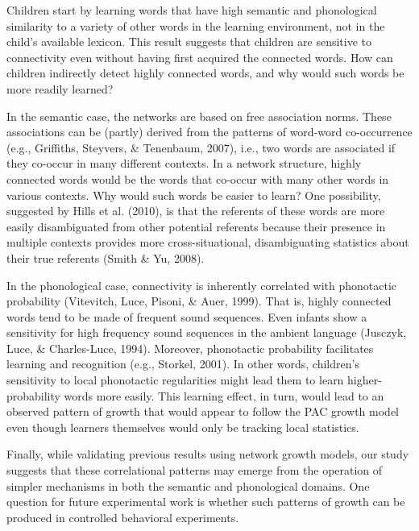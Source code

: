 \documentclass[10pt, letterpaper]{article}
\begin{document}
Children start by learning words that have high semantic and
phonological similarity to a variety of other words in the learning
environment, not in the child's available lexicon. This result suggests
that children are sensitive to connectivity even without having first
acquired the connected words. How can children indirectly detect highly
connected words, and why would such words be more readily learned?

In the semantic case, the networks are based on free association norms.
These associations can be (partly) derived from the patterns of
word-word co-occurrence (e.g., Griffiths, Steyvers, \& Tenenbaum, 2007),
i.e., two words are associated if they co-occur in many different
contexts. In a network structure, highly connected words would be the
words that co-occur with many other words in various contexts. Why would
such words be easier to learn? One possibility, suggested by Hills et
al. (2010), is that the referents of these words are more easily
disambiguated from other potential referents because their presence in
multiple contexts provides more cross-situational, disambiguating
statistics about their true referents (Smith \& Yu, 2008).

In the phonological case, connectivity is inherently correlated with
phonotactic probability (Vitevitch, Luce, Pisoni, \& Auer, 1999). That
is, highly connected words tend to be made of frequent sound sequences.
Even infants show a sensitivity for high frequency sound sequences in
the ambient language (Jusczyk, Luce, \& Charles-Luce, 1994). Moreover,
phonotactic probability facilitates learning and recognition (e.g.,
Storkel, 2001). In other words, children's sensitivity to local
phonotactic regularities might lead them to learn higher-probability
words more easily. This learning effect, in turn, would lead to an
observed pattern of growth that would appear to follow the PAC growth
model even though learners themselves would only be tracking local
statistics.

Finally, while validating previous results using network growth models,
our study suggests that these correlational patterns may emerge from the
operation of simpler mechanisms in both the semantic and phonological
domains. One question for future experimental work is whether such
patterns of growth can be produced in controlled behavioral experiments.

\vspace{1em}

\vspace{1em}
\end{document}
